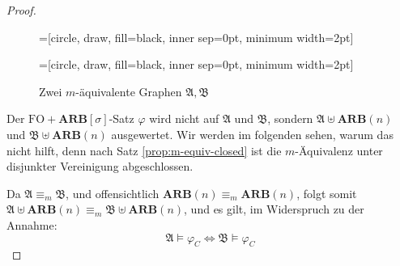 \begin{proof}
\begin{figure}
\begin{centering}
=[circle, draw, fill=black,
                        inner sep=0pt, minimum width=2pt]
=[circle, draw, fill=black,
                        inner sep=0pt, minimum width=2pt]
\par\end{centering}
\caption{\label{fig:m-equiv}Zwei $m$-äquivalente Graphen $\mathfrak{A},\mathfrak{B}$}
\end{figure}

Der $\mathrm{FO}+\mathbf{ARB}\left[\sigma\right]$-Satz $\varphi$
wird nicht auf $\mathfrak{A}$ und $\mathfrak{B}$, sondern $\mathfrak{A}\uplus\mathbf{ARB}\left(n\right)$
und $\mathfrak{B}\uplus\mathbf{ARB}\left(n\right)$ ausgewertet. Wir
werden im folgenden sehen, warum das nicht hilft, denn nach Satz \ref{prop:m-equiv-closed}
ist die $m$-Äquivalenz unter disjunkter Vereinigung abgeschlossen.

Da $\mathfrak{A}\equiv_{m}\mathfrak{B}$, und offensichtlich $\mathbf{ARB}\left(n\right)\equiv_{m}\mathbf{ARB}\left(n\right)$,
folgt somit $\mathfrak{A}\uplus\mathbf{ARB}\left(n\right)\equiv_{m}\mathfrak{B}\uplus\mathbf{ARB}\left(n\right)$,
und es gilt, im Widerspruch zu der Annahme:
\[
\mathfrak{A}\models\varphi_{C}\Leftrightarrow\mathfrak{B}\models\varphi_{C}
\]
\end{proof}
